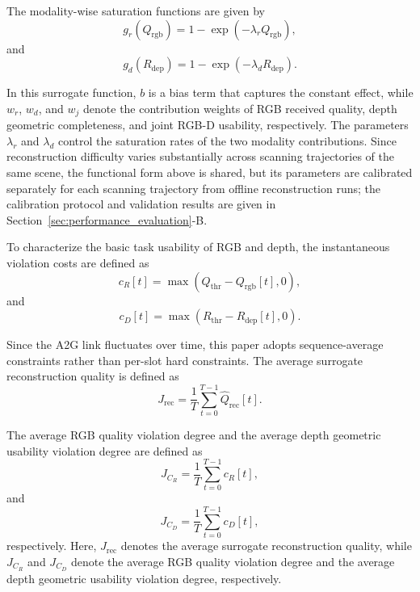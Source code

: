 \documentclass[journal]{IEEEtran}
\begin{document}
The modality-wise saturation functions are given by
\begin{equation}
g_r
\left(
Q_{\mathrm{rgb}}
\right)
=
1-\exp
\left(
-\lambda_r Q_{\mathrm{rgb}}
\right),
\end{equation}
and
\begin{equation}
g_d
\left(
R_{\mathrm{dep}}
\right)
=
1-\exp
\left(
-\lambda_d R_{\mathrm{dep}}
\right).
\end{equation}

In this surrogate function, $b$ is a bias term that captures the constant effect, while $w_r$, $w_d$, and $w_j$ denote the contribution weights of RGB received quality, depth geometric completeness, and joint RGB-D usability, respectively. The parameters $\lambda_r$ and $\lambda_d$ control the saturation rates of the two modality contributions. Since reconstruction difficulty varies substantially across scanning trajectories of the same scene, the functional form above is shared, but its parameters are calibrated separately for each scanning trajectory from offline reconstruction runs; the calibration protocol and validation results are given in Section~\ref{sec:performance_evaluation}-B.

To characterize the basic task usability of RGB and depth, the instantaneous violation costs are defined as
\begin{equation}
c_R[t]
=
\max
\left(
Q_{\mathrm{thr}}-Q_{\mathrm{rgb}}[t],
0
\right),
\end{equation}
and
\begin{equation}
c_D[t]
=
\max
\left(
R_{\mathrm{thr}}-R_{\mathrm{dep}}[t],
0
\right).
\end{equation}

Since the A2G link fluctuates over time, this paper adopts sequence-average constraints rather than per-slot hard constraints. The average surrogate reconstruction quality is defined as
\begin{equation}
J_{\mathrm{rec}}
=
\frac{1}{T}
\sum_{t=0}^{T-1}
\widehat{Q}_{\mathrm{rec}}[t].
\end{equation}

The average RGB quality violation degree and the average depth geometric usability violation degree are defined as
\begin{equation}
J_{C_R}
=
\frac{1}{T}
\sum_{t=0}^{T-1}
c_R[t],
\end{equation}
and
\begin{equation}
J_{C_D}
=
\frac{1}{T}
\sum_{t=0}^{T-1}
c_D[t],
\end{equation}
respectively. Here, $J_{\mathrm{rec}}$ denotes the average surrogate reconstruction quality, while $J_{C_R}$ and $J_{C_D}$ denote the average RGB quality violation degree and the average depth geometric usability violation degree, respectively.
\end{document}
